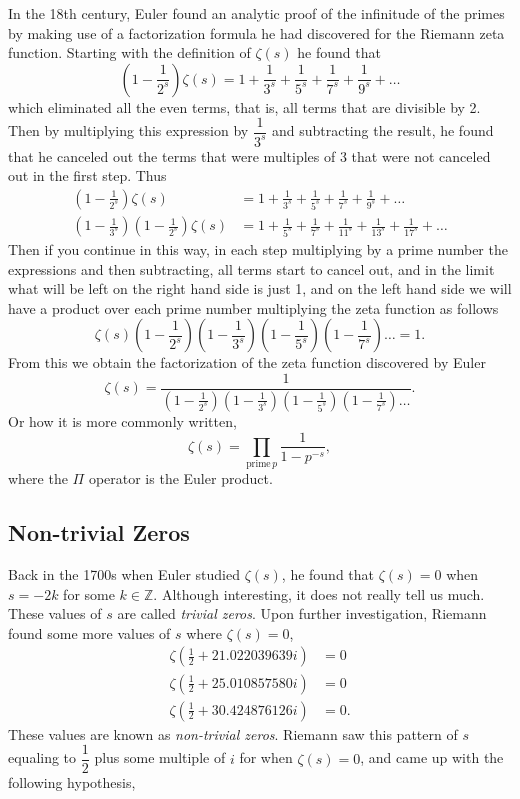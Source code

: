\documentclass[12pt]{article}
\theoremstyle{plain}
\newcommand{\Z}{\mathbb{Z}}
\begin{document}
	In the 18th century, Euler found an analytic proof of the infinitude of the primes by making use of a factorization formula he had discovered for the Riemann zeta function. Starting with the definition of $ \zeta(s) $ he found that 
	\[ \left(1 - \frac{1}{2^s} \right ) \zeta(s) = 1 + \frac{1}{3^s} + \frac{1}{5^s} + \frac{1}{7^s} + \frac{1}{9^s} + \ldots \]
	which eliminated all the even terms, that is, all terms that are divisible by 2. Then by multiplying this expression by $ \dfrac{1}{3^s} $ and subtracting the result, he found that he canceled out the terms that were multiples of 3 that were not canceled out in the first step. Thus
	\begin{align*}
		\left(1 - \frac{1}{2^s} \right) \zeta(s) &= 1 + \frac{1}{3^s} + \frac{1}{5^s} + \frac{1}{7^s} + \frac{1}{9^s} + \ldots\\
		\left(1 - \frac{1}{3^s} \right) \left(1 - \frac{1}{2^s} \right) \zeta(s) &= 1 + \frac{1}{5^s} + \frac{1}{7^s} + \frac{1}{11^s} + \frac{1}{13^s} + \frac{1}{17^s} + \ldots
	\end{align*}
	Then if you continue in this way, in each step multiplying by a prime number the expressions and then subtracting, all terms start to cancel out, and in the limit what will be left on the right hand side is just 1, and on the left hand side we will have a product over each prime number multiplying the zeta function as follows
	\[ \zeta(s) \left(1 - \frac{1}{2^s} \right) \left(1 - \frac{1}{3^s} \right) \left(1 - \frac{1}{5^s} \right) \left(1 - \frac{1}{7^s} \right) \ldots = 1. \]
	From this we obtain the factorization of the zeta function discovered by Euler
	\[ \zeta(s) = \frac{1}{\left(1 - \frac{1}{2^s} \right) \left(1 - \frac{1}{3^s} \right) \left(1 - \frac{1}{5^s} \right) \left(1 - \frac{1}{7^s} \right) \ldots}. \]
	Or how it is more commonly written, 
	\[ \zeta(s) = \prod_{\text{prime} \, p} \frac{1}{1-p^{-s}}, \]
	where the $ \Pi $ operator is the Euler product.
	
	
	\subsection{Non-trivial Zeros}
	
	Back in the 1700s when Euler studied $ \zeta(s) $, he found that $ \zeta(s) = 0 $ when $ s = -2k $ for some $ k \in \Z $. Although interesting, it does not really tell us much. These values of $ s $ are called \textit{trivial zeros}. Upon further investigation, Riemann found some more values of $ s $ where $ \zeta(s) = 0 $,
	\begin{align*}
		\zeta(\frac{1}{2} + 21.022039639 i) &= 0\\
		\zeta(\frac{1}{2} + 25.010857580 i) &= 0\\
		\zeta(\frac{1}{2} + 30.424876126 i) &= 0.
	\end{align*}
	These values are known as \textit{non-trivial zeros}. Riemann saw this pattern of $ s $ equaling to $ \dfrac{1}{2} $ plus some multiple of $ i $ for when $ \zeta(s) = 0 $, and came up with the following hypothesis,
\end{document}
